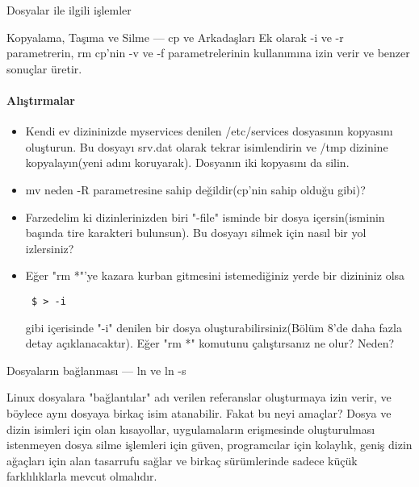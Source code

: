 \begin{section}{Dosyalar ile ilgili işlemler}
\begin{subsection}{Kopyalama, Taşıma ve Silme — cp ve Arkadaşları}
Ek olarak -i ve -r parametrerin, rm cp'nin -v ve -f parametrelerinin kullanımına izin verir ve benzer sonuçlar üretir.

\paragraph{Alıştırmalar}{
\begin{itemize}
 \item Kendi ev dizininizde myservices denilen /etc/services dosyasının kopyasını oluşturun. Bu dosyayı srv.dat olarak tekrar isimlendirin ve /tmp dizinine kopyalayın(yeni adını koruyarak). Dosyanın iki kopyasını da silin.
 \item mv neden -R parametresine sahip değildir(cp'nin sahip olduğu gibi)?
 \item Farzedelim ki dizinlerinizden biri "-file" isminde bir dosya içersin(isminin başında tire karakteri bulunsun). Bu dosyayı silmek için nasıl bir yol izlersiniz?
 \item Eğer "rm *"'ye kazara kurban gitmesini istemediğiniz yerde bir dizininiz olsa \begin{verbatim}
 $ > -i
 \end{verbatim}gibi içerisinde "-i" denilen bir dosya oluşturabilirsiniz(Bölüm 8'de daha fazla detay açıklanacaktır). Eğer "rm *" komutunu çalıştırsanız ne olur? Neden?
\end{itemize}}
\end{subsection}
\begin{subsection}{Dosyaların bağlanması — ln ve ln -s}

Linux dosyalara "bağlantılar" adı verilen referanslar oluşturmaya izin verir, ve böylece aynı dosyaya birkaç isim atanabilir. Fakat bu neyi amaçlar? Dosya ve dizin isimleri için olan kısayollar, uygulamaların erişmesinde oluşturulması istenmeyen dosya silme işlemleri için güven, programcılar için kolaylık, geniş dizin ağaçları için alan tasarrufu sağlar ve birkaç sürümlerinde sadece küçük farklılıklarla mevcut olmalıdır.


\end{subsection}
\end{section}
